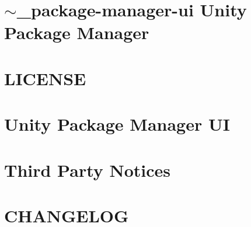 \let\mypdfximage\pdfximage\def\pdfximage{\immediate\mypdfximage}\documentclass[twoside]{book}
\newcommand{\+}{\discretionary{\mbox{\scriptsize$\hookleftarrow$}}{}{}}
\begin{document}
\chapter{$\sim$\+\_\+package-\/manager-\/ui Unity Package Manager}
\label{md__o_1__git_h_u_b_m_i_n_i_p_roject__library__package_cache_com_8unity_8package-manager-ui_0D2_80_87__documentation}

\chapter{L\+I\+C\+E\+N\+SE}
\label{md__o_1__git_h_u_b_m_i_n_i_p_roject__library__package_cache_com_8unity_8package-manager-ui_0D2_80_87__l_i_c_e_n_s_e}

\chapter{Unity Package Manager UI}
\label{md__o_1__git_h_u_b_m_i_n_i_p_roject__library__package_cache_com_8unity_8package-manager-ui_0D2_80_87__r_e_a_d_m_e}

\chapter{Third Party Notices}
\label{md__o_1__git_h_u_b_m_i_n_i_p_roject__library__package_cache_com_8unity_8package-manager-ui_0D2_80_87__third__party__notices}

\chapter{C\+H\+A\+N\+G\+E\+L\+OG}
\label{md__o_1__git_h_u_b_m_i_n_i_p_roject__library__package_cache_com_8unity_8purchasing_0D2_80_83__c_h_a_n_g_e_l_o_g}

\end{document}
